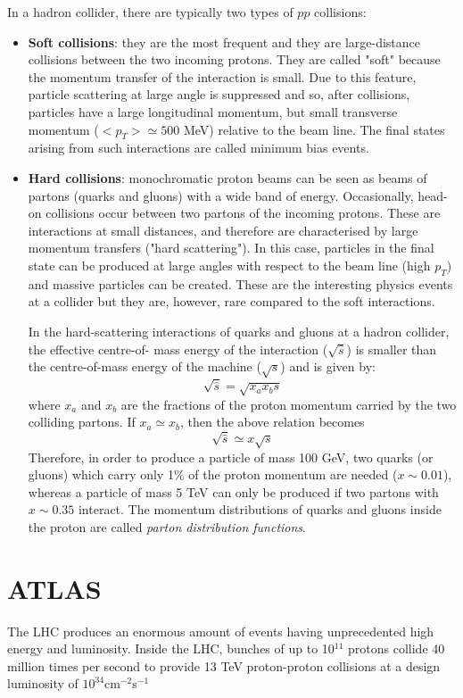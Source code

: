 \documentclass[a4paper, oneside, 11pt, openright]{book}
\begin{document}
				In a hadron collider, there are typically two types of $pp$ collisions:
				\begin{itemize}
					\item \textbf{Soft collisions}: 
					they are the most frequent and they are large-distance collisions between the two incoming protons. They are called "soft" because the momentum transfer of the interaction is small. Due to this feature, particle scattering at large angle is suppressed and so, after collisions, particles have a large longitudinal momentum, but small transverse momentum ($<p_T>\simeq500$ MeV) relative to the beam line. The final states
					arising from such interactions are called minimum bias events.
					\item \textbf{Hard collisions}:
					monochromatic proton beams can be seen as beams of partons (quarks and gluons) with a wide band
					of energy. Occasionally, head-on collisions occur between two partons of the incoming protons. These are interactions at small distances, and therefore are characterised by large
					momentum transfers ("hard scattering"). In this case, particles in the final state can be produced at large angles with respect to the beam line (high $p_T$) and massive particles can be created.
					These are the interesting physics events at a collider but they are, however, rare compared to the soft interactions.
					
					In the hard-scattering interactions of quarks and gluons at a hadron collider, the effective centre-of-
					mass energy of the interaction ($\sqrt{\hat{s}}$) is smaller than the centre-of-mass energy of the machine ($\sqrt{s}$) and is given by: 
					$$ 
					\sqrt{\hat{s}} = \sqrt{x_ax_bs}
					$$
					where $x_a$ and $x_b$ are the fractions of the proton momentum carried by the two colliding partons. If $x_a \simeq x_b$, then the above relation becomes
					$$ 
					\sqrt{\hat{s}} \simeq x\sqrt{s}
					$$
					Therefore, in order to produce a particle of mass 100 GeV, two quarks (or gluons) which carry only 1\% of the proton momentum are needed ($x \sim 0.01$), whereas a particle of mass 5 TeV can only be produced if two partons with $x \sim 0.35$ interact. The momentum distributions of quarks and gluons inside the proton are called \textit{parton distribution functions}. %
				\end{itemize}
			
	
	
		\section{ATLAS}
			The LHC produces an enormous amount of events having unprecedented high energy and luminosity. Inside the LHC, bunches of up to 10$^{11}$ protons collide 40 million times per second to provide 13 TeV proton-proton collisions at a design luminosity of $10^{34} $cm$^{-2}$s$^{-1}$
			
\end{document}
